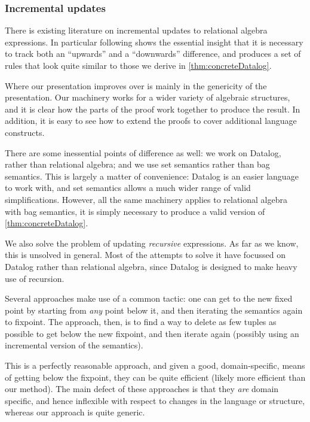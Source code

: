 \subsubsection{Incremental updates}

There is existing literature on incremental updates to relational algebra
expressions. In particular \textcite{griffin1997improved} following
\textcite{qian1991incremental} shows the essential insight that it is necessary to
track both an ``upwards'' and a ``downwards'' difference, and produces a set of
rules that look quite similar to those we derive in \cref{thm:concreteDatalog}.

Where our presentation improves over \citeauthor{griffin1997improved} is mainly in
the genericity of the presentation. Our machinery works for a wider variety of
algebraic structures, and it is clear how the parts of the proof work together
to produce the result. In addition, it is easy to see how to extend the proofs
to cover additional language constructs.

There are some inessential points of difference as well: we work on Datalog,
rather than relational algebra; and we use set semantics rather than bag
semantics. This is largely a matter of convenience: Datalog is an easier
language to work with, and set semantics allows a much wider range of valid
simplifications. However, all the same machinery applies to relational algebra
with bag semantics, it is simply necessary to produce a valid version of \cref{thm:concreteDatalog}.

We also solve the problem of updating \emph{recursive} expressions. As far as we
know, this is unsolved in general. Most of the attempts to solve it have
focussed on Datalog rather than relational algebra, since Datalog is designed to
make heavy use of recursion.

Several approaches
\autocites{gupta1993maintaining}{harrison1992maintenance}
make use of a common tactic: one can get to the new fixed
point by starting from \emph{any} point below it, and then iterating the
semantics again to fixpoint. The approach, then, is to find a way to delete as
few tuples as possible to get below the new fixpoint, and then iterate again
(possibly using an incremental version of the semantics).

This is a perfectly reasonable approach, and given a good, domain-specific,
means of getting below the fixpoint, they can be quite efficient (likely more
efficient than our method). The main defect of these approaches is that they
\emph{are} domain specific, and hence inflexible with respect to changes in the
language or structure, whereas our approach is quite generic.

